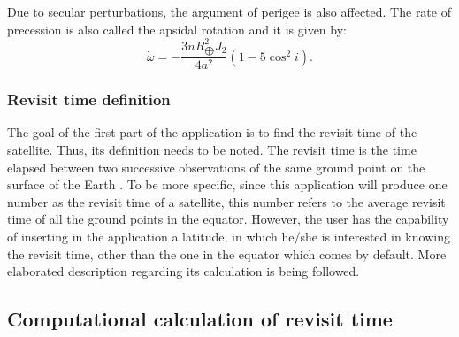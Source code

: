 Due to secular perturbations, the argument of perigee is also affected. The rate of precession is also called the apsidal rotation and it is given by:
\begin{equation}
\dot{\omega} = - \frac{3 n R_{\bigoplus}^{2} J_{2}}{4 a^{2}} (1 - 5 \cos^{2}{i}).
\end{equation}


\bigskip
\subsubsection{Revisit time definition}
\bigskip

The goal of the first part of the application is to find the revisit time of the satellite. Thus, its definition needs to be noted. The revisit time is the time elapsed between two successive observations of the same ground point on the surface of the Earth \cite{Luo}. To be more specific, since this application will produce one number as the revisit time of a satellite, this number refers to the average revisit time of all the ground points in the equator. However, the user has the capability of inserting in the application a latitude, in which he/she is interested in knowing the revisit time, other than the one in the equator which comes by default. More elaborated description regarding its calculation is being followed.


\bigskip
\subsection{Computational calculation of revisit time}
\bigskip

